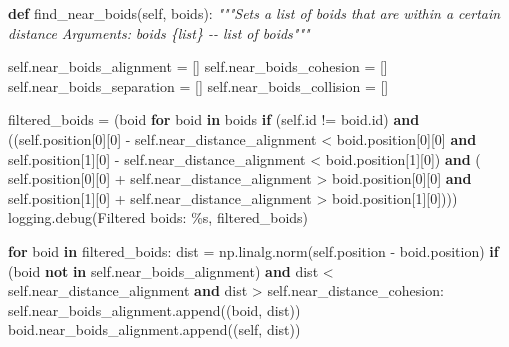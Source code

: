 \documentclass[
]{article}
\newenvironment{Shaded}{}{}
\newcommand{\BuiltInTok}[1]{#1}
\newcommand{\CommentTok}[1]{\textcolor[rgb]{0.38,0.63,0.69}{\textit{#1}}}
\newcommand{\ControlFlowTok}[1]{\textcolor[rgb]{0.00,0.44,0.13}{\textbf{#1}}}
\newcommand{\DecValTok}[1]{\textcolor[rgb]{0.25,0.63,0.44}{#1}}
\newcommand{\KeywordTok}[1]{\textcolor[rgb]{0.00,0.44,0.13}{\textbf{#1}}}
\newcommand{\NormalTok}[1]{#1}
\newcommand{\OperatorTok}[1]{\textcolor[rgb]{0.40,0.40,0.40}{#1}}
\newcommand{\SpecialCharTok}[1]{\textcolor[rgb]{0.25,0.44,0.63}{#1}}
\newcommand{\StringTok}[1]{\textcolor[rgb]{0.25,0.44,0.63}{#1}}
\newcommand{\VariableTok}[1]{\textcolor[rgb]{0.10,0.09,0.49}{#1}}
\begin{document}
\begin{Shaded}
\begin{Highlighting}[]
\KeywordTok{def}\NormalTok{ find\_near\_boids(}\VariableTok{self}\NormalTok{, boids):}
    \CommentTok{"""Sets a list of boids that are within a certain distance}
\CommentTok{    Arguments:}
\CommentTok{        boids \{list\} {-}{-} list of boids"""}

    \VariableTok{self}\NormalTok{.near\_boids\_alignment }\OperatorTok{=}\NormalTok{ []}
    \VariableTok{self}\NormalTok{.near\_boids\_cohesion }\OperatorTok{=}\NormalTok{ []}
    \VariableTok{self}\NormalTok{.near\_boids\_separation }\OperatorTok{=}\NormalTok{ []}
    \VariableTok{self}\NormalTok{.near\_boids\_collision }\OperatorTok{=}\NormalTok{ []}

\NormalTok{    filtered\_boids }\OperatorTok{=}\NormalTok{ (boid }\ControlFlowTok{for}\NormalTok{ boid }\KeywordTok{in}\NormalTok{ boids }\ControlFlowTok{if}\NormalTok{ (}\VariableTok{self}\NormalTok{.}\BuiltInTok{id} \OperatorTok{!=}\NormalTok{ boid.}\BuiltInTok{id}\NormalTok{) }\KeywordTok{and}\NormalTok{ ((}\VariableTok{self}\NormalTok{.position[}\DecValTok{0}\NormalTok{][}\DecValTok{0}\NormalTok{] }\OperatorTok{{-}} \VariableTok{self}\NormalTok{.near\_distance\_alignment }\OperatorTok{\textless{}}\NormalTok{ boid.position[}\DecValTok{0}\NormalTok{][}\DecValTok{0}\NormalTok{] }\KeywordTok{and} \VariableTok{self}\NormalTok{.position[}\DecValTok{1}\NormalTok{][}\DecValTok{0}\NormalTok{] }\OperatorTok{{-}} \VariableTok{self}\NormalTok{.near\_distance\_alignment }\OperatorTok{\textless{}}\NormalTok{ boid.position[}\DecValTok{1}\NormalTok{][}\DecValTok{0}\NormalTok{]) }\KeywordTok{and}\NormalTok{ (}
        \VariableTok{self}\NormalTok{.position[}\DecValTok{0}\NormalTok{][}\DecValTok{0}\NormalTok{] }\OperatorTok{+} \VariableTok{self}\NormalTok{.near\_distance\_alignment }\OperatorTok{\textgreater{}}\NormalTok{ boid.position[}\DecValTok{0}\NormalTok{][}\DecValTok{0}\NormalTok{] }\KeywordTok{and} \VariableTok{self}\NormalTok{.position[}\DecValTok{1}\NormalTok{][}\DecValTok{0}\NormalTok{] }\OperatorTok{+} \VariableTok{self}\NormalTok{.near\_distance\_alignment }\OperatorTok{\textgreater{}}\NormalTok{ boid.position[}\DecValTok{1}\NormalTok{][}\DecValTok{0}\NormalTok{])))}
\NormalTok{    logging.debug(}\StringTok{\textquotesingle{}Filtered boids: }\SpecialCharTok{\%s}\StringTok{\textquotesingle{}}\NormalTok{, filtered\_boids)}

    \ControlFlowTok{for}\NormalTok{ boid }\KeywordTok{in}\NormalTok{ filtered\_boids:}
\NormalTok{        dist }\OperatorTok{=}\NormalTok{ np.linalg.norm(}\VariableTok{self}\NormalTok{.position }\OperatorTok{{-}}\NormalTok{ boid.position)}
        \ControlFlowTok{if}\NormalTok{ (boid }\KeywordTok{not} \KeywordTok{in} \VariableTok{self}\NormalTok{.near\_boids\_alignment) }\KeywordTok{and}\NormalTok{ dist }\OperatorTok{\textless{}} \VariableTok{self}\NormalTok{.near\_distance\_alignment }\KeywordTok{and}\NormalTok{ dist }\OperatorTok{\textgreater{}} \VariableTok{self}\NormalTok{.near\_distance\_cohesion:}
            \VariableTok{self}\NormalTok{.near\_boids\_alignment.append((boid, dist))}
\NormalTok{            boid.near\_boids\_alignment.append((}\VariableTok{self}\NormalTok{, dist))}


\end{Highlighting}
\end{Shaded}
\end{document}
